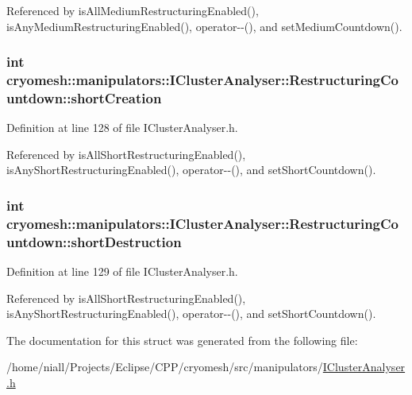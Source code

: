 \-Referenced by is\-All\-Medium\-Restructuring\-Enabled(), is\-Any\-Medium\-Restructuring\-Enabled(), operator-\/-\/(), and set\-Medium\-Countdown().

\hypertarget{structcryomesh_1_1manipulators_1_1IClusterAnalyser_1_1RestructuringCountdown_a4e0fb0eb08819e98beb74f9ceda06964}{
\subsubsection[{short\-Creation}]{\setlength{\rightskip}{0pt plus 5cm}int {\bf cryomesh\-::manipulators\-::\-I\-Cluster\-Analyser\-::\-Restructuring\-Countdown\-::short\-Creation}}}\label{structcryomesh_1_1manipulators_1_1IClusterAnalyser_1_1RestructuringCountdown_a4e0fb0eb08819e98beb74f9ceda06964}


\-Definition at line 128 of file \-I\-Cluster\-Analyser.\-h.



\-Referenced by is\-All\-Short\-Restructuring\-Enabled(), is\-Any\-Short\-Restructuring\-Enabled(), operator-\/-\/(), and set\-Short\-Countdown().

\hypertarget{structcryomesh_1_1manipulators_1_1IClusterAnalyser_1_1RestructuringCountdown_aa4c23b58d7bdbdc1e6ffa1161cfa0da2}{
\subsubsection[{short\-Destruction}]{\setlength{\rightskip}{0pt plus 5cm}int {\bf cryomesh\-::manipulators\-::\-I\-Cluster\-Analyser\-::\-Restructuring\-Countdown\-::short\-Destruction}}}\label{structcryomesh_1_1manipulators_1_1IClusterAnalyser_1_1RestructuringCountdown_aa4c23b58d7bdbdc1e6ffa1161cfa0da2}


\-Definition at line 129 of file \-I\-Cluster\-Analyser.\-h.



\-Referenced by is\-All\-Short\-Restructuring\-Enabled(), is\-Any\-Short\-Restructuring\-Enabled(), operator-\/-\/(), and set\-Short\-Countdown().



\-The documentation for this struct was generated from the following file\-:\begin{DoxyCompactItemize}
\item 
/home/niall/\-Projects/\-Eclipse/\-C\-P\-P/cryomesh/src/manipulators/\hyperlink{IClusterAnalyser_8h}{\-I\-Cluster\-Analyser.\-h}\end{DoxyCompactItemize}
